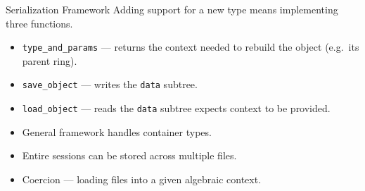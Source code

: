 \documentclass[9pt]{beamer}
\begin{document}
\begin{frame}[fragile]{Serialization Framework}
  Adding support for a new type means implementing three functions.
  \vspace{3mm}
  \begin{tcolorbox}[colframe=LineColor, colback=white, boxrule=0.5pt]
    \begin{itemize}\itemsep=\smallskipamount
    \item \texttt{type\_and\_params} --- returns the context needed to
      rebuild the object (e.g.\ its parent ring).
      \vspace{3mm}
    \item \texttt{save\_object} --- writes the \texttt{data} subtree.
      \vspace{3mm}
    \item \texttt{load\_object} --- reads the \texttt{data} subtree expects context to be provided.
    \end{itemize}
  \end{tcolorbox}
  \pause
  \vspace{3mm}
  \begin{tcolorbox}[colframe=LineColor, colback=white, boxrule=0.5pt]
    \begin{itemize}\itemsep=\smallskipamount
    \item General framework handles container types.
      \vspace{3mm}
    \item Entire sessions can be stored across multiple files.
      \vspace{3mm}
    \item Coercion --- loading files into a given algebraic context.
    \end{itemize}
  \end{tcolorbox}
\end{frame}
\end{document}
